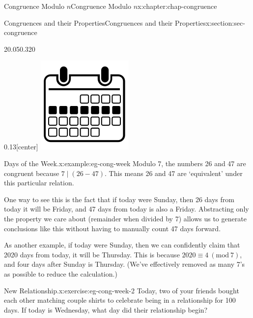 \documentclass[oneside,10pt,]{book}
\numberwithin{equation}{section}
\newcommand{\Mod}[1]{\ \left(\mathrm{mod}\ #1\right)}
\begin{document}
\begin{chapterptx}{Congruence Modulo \(n\)}{}{Congruence Modulo \(n\)}{}{}{x:chapter:chap-congruence}
\begin{sectionptx}{Congruences and their Properties}{}{Congruences and their Properties}{}{}{x:section:sec-congruence}
\begin{sidebyside}{2}{0.05}{0.32}{0}
\begin{sbspanel}{0.13}[center]
\includegraphics[width=\linewidth]{figs/noun_week_247256.svg}
\end{sbspanel}%
\end{sidebyside}%
\begin{example}{Days of the Week.}{x:example:eg-cong-week}%
Modulo 7, the numbers 26 and 47 are congruent because \(7 \mid (26-47)\). This means 26 and 47 are `equivalent' under this particular relation.%
\par
One way to see this is the fact that if today were Sunday, then 26 days from today it will be Friday, and 47 days from today is also a Friday. Abstracting only the property we care about (remainder when divided by 7) allows us to generate conclusions like this without having to manually count 47 days forward.%
\par
As another example, if today were Sunday, then we can confidently claim that 2020 days from today, it will be Thursday. This is because \(2020 \equiv 4 \Mod{7}\), and four days after Sunday is Thursday. (We've effectively removed as many 7's as possible to reduce the calculation.)%
\end{example}
\begin{inlineexercise}{New Relationship.}{x:exercise:eg-cong-week-2}%
Today, two of your friends bought each other matching couple shirts to celebrate being in a relationship for 100 days. If today is Wednesday, what day did their relationship begin?%

\end{inlineexercise}
\end{sectionptx}
\end{chapterptx}
\end{document}
